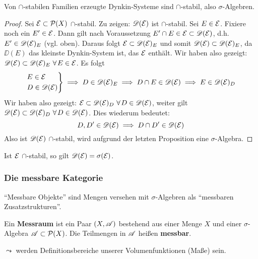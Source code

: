 \begin{satz} \label{durchschnittstabil-familie-erz}
\begin{mdframed}
Von $\cap$-stabilen Familien erzeugte Dynkin-Systeme sind $\cap$-stabil, also $\sigma$-Algebren.
\end{mdframed}
\begin{proof}
Sei $\EE \subset \PP(X)$ $\cap$-stabil. Zu zeigen: $\DD(\EE)$ ist $\cap$-stabil. Sei $E \in \EE$. Fixiere noch ein $E' \in \EE$. Dann gilt nach Voraussetzung $E' \cap E \in \EE \subset \DD(\EE)$, d.h. $E' \in \DD(\EE)_E$ (vgl. oben). Daraus folgt $\EE \subset \DD(\EE)_E$ und somit $\DD(\EE) \subset \DD(\EE)_E$, da $\DD(E)$ das kleinste Dynkin-System ist, das $\EE$ enthält. Wir haben also gezeigt: $\DD(\EE)\subset \DD(\EE)_E \ \forall E \in \EE$. Es folgt
\begin{equation*}
\begin{rcases}
	E \in \EE \\
	D \in \DD(\EE)
\end{rcases}
\implies 
D \in \DD(\EE)_E\implies
D \cap E \in \DD(\EE) \implies E \in \DD(\EE)_D
\end{equation*}
Wir haben also gezeigt: $\EE \subset \DD(\EE)_D \ \forall D \in \DD(\EE)$, weiter gilt $\DD(\EE)\subset \DD(\EE)_D \ \forall D \in \DD(\EE)$. Dies wiederum bedeutet:
\begin{equation*}
	D,D' \in \DD(\EE) \implies D \cap  D' \in \DD(\EE)
\end{equation*}
Also ist $\DD(\EE)$ $\cap$-stabil, wird aufgrund der letzten Proposition eine $\sigma$-Algebra.
\end{proof}
\begin{remark}
Ist $\EE$ $\cap$-stabil, so gilt $\DD(\EE) =\sigma (\EE)$.
\end{remark}
\end{satz}
\subsubsection{Die messbare Kategorie}
``Messbare Objekte'' sind Mengen versehen mit $\sigma$-Algebren als ``messbaren Zusatzstrukturen''.
\begin{definition}
\begin{mdframed}
Ein \textbf{Messraum} ist ein Paar $(X,\AA)$ bestehend aus einer Menge $X$ und einer $\sigma$-Algebra $\AA \subset \PP(X)$. Die Teilmengen in $\AA$ heißen \textbf{messbar}.
\end{mdframed}
\end{definition}
$\leadsto$ werden Definitionsbereiche unserer Volumenfunktionen (Maße) sein.

